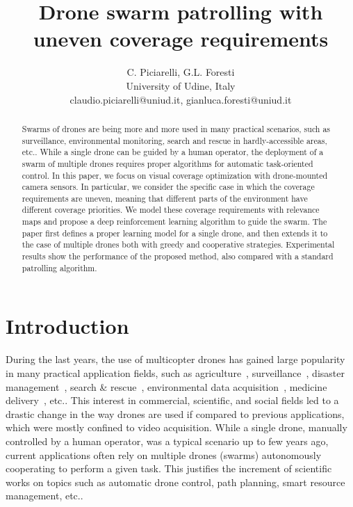 \documentclass{article}
\begin{document}
\title{Drone swarm patrolling with uneven coverage requirements}
\author{C. Piciarelli, G.L. Foresti\\
University of Udine, Italy\\
claudio.piciarelli@uniud.it, gianluca.foresti@uniud.it}
\date{}


\maketitle

\begin{abstract}
Swarms of drones are being more and more used in many practical scenarios, such as surveillance, environmental monitoring, search and rescue in hardly-accessible areas, etc.. While a single drone can be guided by a human operator, the deployment of a swarm of multiple drones requires proper algorithms for automatic task-oriented control. In this paper, we focus on visual coverage optimization with drone-mounted camera sensors. In particular, we consider the specific case in which the coverage requirements are uneven, meaning that different parts of the environment have different coverage priorities. We model these coverage requirements with relevance maps and propose a deep reinforcement learning algorithm to guide the swarm. The paper first defines a proper learning model for a single drone, and then extends it to the case of multiple drones both with greedy and cooperative strategies. Experimental results show the performance of the proposed method, also compared with a standard patrolling algorithm.
\end{abstract}


\section{Introduction}
\label{sec:introduction}
During the last years, the use of multicopter drones has gained large popularity in many practical application fields, such as agriculture~\cite{tripicchio2015towards}, surveillance~\cite{motlagh2017uav}, disaster management~\cite{erdelj2017help}, search \& rescue~\cite{silvagni2017multipurpose}, environmental data acquisition~\cite{cruzan2016small}, medicine delivery~\cite{thiels2015use}, etc.. This interest in commercial, scientific, and social fields led to a drastic change in the way drones are used if compared to previous applications, which were mostly confined to video acquisition. While a single drone, manually controlled by a human operator, was a typical scenario up to few years ago, current applications often rely on multiple drones (swarms) autonomously cooperating to perform a given task. This justifies the increment of scientific works on topics such as automatic drone control, path planning, smart resource management, etc..
\end{document}
